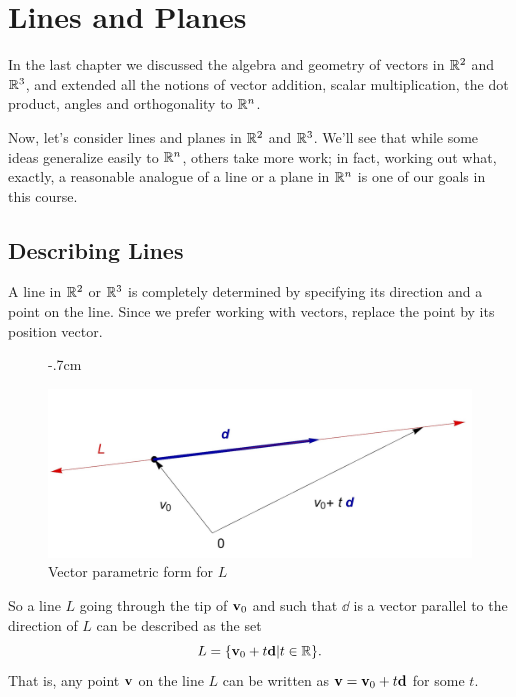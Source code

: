 \chapter{Lines and Planes}
\label{Chapter:03linesplanes}

In the last chapter we discussed the algebra and geometry of vectors in
$\mathbb{R}^2$ and $\mathbb{R}^3$, and extended all the notions of vector addition,
scalar multiplication, the dot product, angles and orthogonality
to $\mathbb{R}^n$.  

Now, let's consider lines and planes in $\mathbb{R}^2$ and $\mathbb{R}^3$.  
We'll see that while some ideas generalize easily
to $\mathbb{R}^n$, others take more work; in fact, working out what, exactly,
a reasonable analogue of a line or a plane in $\mathbb{R}^n$    
is one of our goals in this course.


\section{Describing Lines}

A line in $\mathbb{R}^2$ or $\mathbb{R}^3$ 
is completely determined by specifying its direction and
a point on the line.  Since we prefer working with vectors, replace
the point by its position vector.

\begin{figure}
\begin{center}
\vglue-.7cm

\includegraphics[scale=.1]{img/linepoint-directionvector.jpg}
\end{center}

\caption{Vector parametric form for $L$}\label{vectorparametricformplane}
\end{figure}


So a line $L$ going through the tip of $\mathbf{v}_0$ and such that $\dd$
is a vector parallel to the direction of $L$ can be described as
the set
$$
L = \{ \mathbf{v}_0 + t \mathbf{d} | t\in \mathbb{R}\}.
$$
That is, any point $\mathbf{v}$ on the line $L$ can be written as $\mathbf{v} = \mathbf{v}_0+t\mathbf{d}$ for some $t$.

